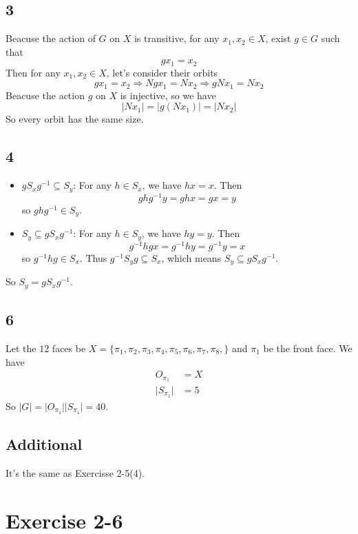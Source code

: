 \documentclass[draft]{article}
\begin{document}
		\subsection*{3}
			Beacuse the action of $G$ on $X$ is transitive, for any $x_1, x_2 \in X$,
			exist $g \in G$ such that
			$$
				gx_1 = x_2
			$$
			Then for any $x_1, x_2 \in X$, let's consider their orbits
			$$
				gx_1 = x_2 \Rightarrow Ngx_1 = Nx_2 \Rightarrow gNx_1 = Nx_2
			$$
			Beacuse the action $g$ on $X$ is injective, so we have
			$$
				\vert Nx_1 \vert = \vert g(Nx_1) \vert = \vert Nx_2 \vert
			$$
			So every orbit has the same size.
		\subsection*{4}
			\begin{itemize}
				\item $gS_xg^{-1}\subseteq S_y$:
					For any $h \in S_x$, we have $hx = x$. Then
					$$
					ghg^{-1}y = ghx = gx = y
					$$
					so $ghg^{-1} \in S_y$.
				\item $S_y\subseteq gS_xg^{-1}$:
					For any $h \in S_y$, we have $hy = y$. Then
					$$
					g^{-1}hgx = g^{-1}hy = g^{-1}y = x
					$$
					so $g^{-1}hg \in S_x$. Thus $g^{-1}S_yg \subseteq S_x$, which means
					$S_y \subseteq gS_xg^{-1}$.
			\end{itemize}
			So $S_y = gS_xg^{-1}$.

		\subsection*{6}
			Let the $12$ faces be 
			$X = \{ \pi_1, \pi_2, \pi_3, \pi_4, \pi_5, \pi_6, \pi_7, \pi_8, \}$ and
			$\pi_1$ be the front face.
			We have 
			\begin{equation*}
				\begin{split}
					O_{\pi_1} & = X \\
					\vert S_{\pi_1} \vert & = 5
				\end{split}
			\end{equation*}
			So $\vert G \vert = \vert O_{\pi_1} \vert \vert S_{\pi_1}\vert = 40$.
		\subsection*{Additional}
			It's the same as Exercisse 2-5(4).
	\section*{Exercise 2-6}
\end{document}

